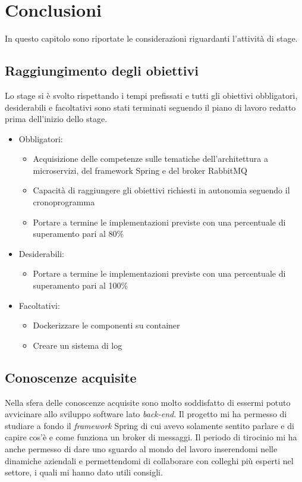 \chapter{Conclusioni}

In questo capitolo sono riportate le considerazioni riguardanti l'attività di stage.

\section{Raggiungimento degli obiettivi}

Lo stage si è svolto rispettando i tempi prefissati e tutti gli obiettivi obbligatori, desiderabili e facoltativi sono stati terminati seguendo il piano di lavoro redatto prima dell'inizio dello stage.
\begin{itemize}
    \item Obbligatori:
    \begin{itemize}
        \item Acquisizione delle competenze sulle tematiche dell'architettura a microservizi, del framework Spring e del broker RabbitMQ
        \item Capacità di raggiungere gli obiettivi richiesti in autonomia seguendo il cronoprogramma
        \item Portare a termine le implementazioni previste con una percentuale di superamento pari al 80\%
    \end{itemize}
    \item Desiderabili:
    \begin{itemize}
        \item Portare a termine le implementazioni previste con una percentuale di superamento pari al 100\%
    \end{itemize}
    \item Facoltativi:
    \begin{itemize}
        \item Dockerizzare le componenti su container
        \item Creare un sistema di log
    \end{itemize}
\end{itemize}

\section{Conoscenze acquisite}

Nella sfera delle conoscenze acquisite sono molto soddisfatto di essermi potuto avvicinare allo sviluppo software lato \textit{back-end}. Il progetto mi ha permesso di studiare a fondo il \textit{framework} Spring di cui avevo solamente sentito parlare e di capire cos'è e come funziona un broker di messaggi. Il periodo di tirocinio mi ha anche permesso di dare uno sguardo al mondo del lavoro inserendomi nelle dinamiche aziendali e permettendomi di collaborare con colleghi più esperti nel settore, i quali mi hanno dato utili consigli.
